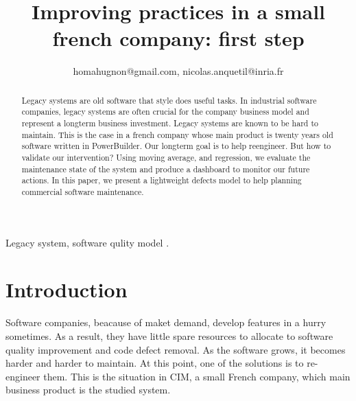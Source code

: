 \documentclass[10pt,conference]{IEEEtran}
\begin{document}
\title{Improving practices in a small french  company: first step}

\author{
homahugnon@gmail.com, nicolas.anquetil@inria.fr}


\maketitle

\begin{abstract}
Legacy systems are old software that style does useful tasks.
In industrial software companies, legacy systems are often crucial for the company business model and represent a longterm business investment.
Legacy systems are known to be hard to maintain.
This is the case in a french company whose main product is twenty years old software written in PowerBuilder.
Our longterm goal is to help reengineer.
But how to validate our intervention?
Using moving average, and regression, we evaluate the maintenance state of the system and produce a dashboard to monitor our future actions.
 In this paper, we present a lightweight defects model to help planning commercial software maintenance.
\end{abstract}

\begin{IEEEkeywords}
Legacy system, software qulity model .
\end{IEEEkeywords}

\section{Introduction}
Software companies, beacause of maket demand, develop features  in a hurry sometimes.
As a result, they have little spare resources to allocate to software quality improvement and code defect removal.
As the software grows,  it becomes harder and harder to maintain.
At this point, one of the solutions is to re-engineer them. 
This is the situation in CIM, a small French company, which main business product  is the studied system.
\end{document}
